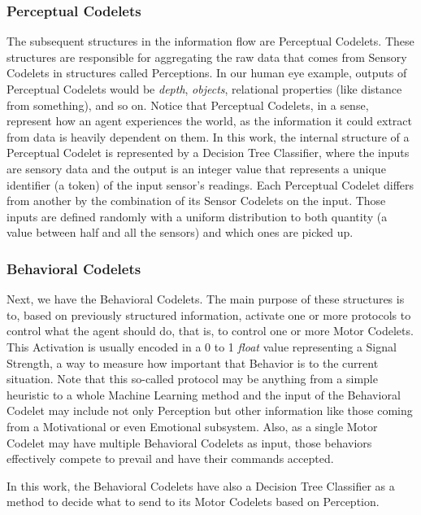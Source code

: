  \subsubsection{Perceptual Codelets}
 \label{sub:per}
 The subsequent structures in the information flow are Perceptual Codelets. These structures are responsible for aggregating the raw data that comes from Sensory Codelets in structures called Perceptions. In our human eye example, outputs of Perceptual Codelets would be \emph{depth}, \emph{objects}, relational properties (like distance from something), and so on. Notice that Perceptual Codelets, in a sense, represent how an agent experiences the world, as the information it could extract from data is heavily dependent on them. In this work, the internal structure of a Perceptual Codelet is represented by a Decision Tree Classifier, where the inputs are sensory data and the output is an integer value that represents a unique identifier (a token) of the input sensor's readings. Each Perceptual Codelet differs from another by the combination of its Sensor Codelets on the input. Those inputs are defined randomly with a uniform distribution to both quantity (a value between half and all the sensors) and which ones are picked up. %
  
  
 \subsubsection{Behavioral Codelets}
 Next, we have the Behavioral Codelets. The main purpose of these structures is to, based on previously structured information, activate one or more protocols to control what the agent should do, that is, to control one or more Motor Codelets. This Activation is usually encoded in a 0 to 1 \emph{float} value representing a Signal Strength, a way to measure how important that Behavior is to the current situation. Note that this so-called protocol may be anything from a simple heuristic to a whole Machine Learning method and the input of the Behavioral Codelet may include not only Perception but other information like those coming from a Motivational or even Emotional subsystem. Also, as a single Motor Codelet may have multiple Behavioral Codelets as input, those behaviors effectively compete to prevail and have their commands accepted.
   
   In this work, the Behavioral Codelets have also a Decision Tree Classifier as a method to decide what to send to its Motor Codelets based on Perception. 
   
